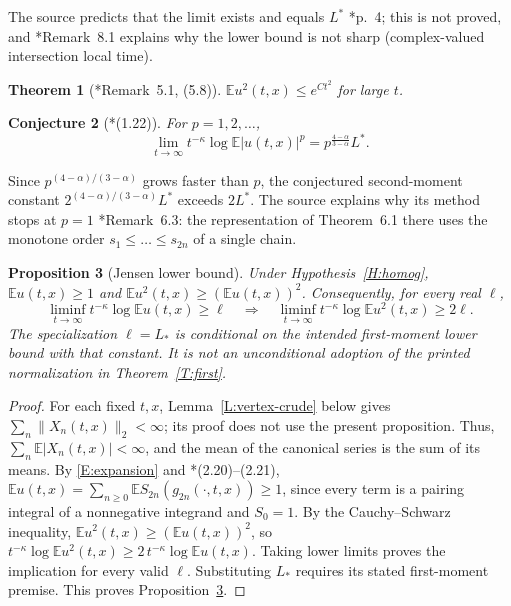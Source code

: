 \documentclass[12pt]{article}
\numberwithin{equation}{section}
\newtheorem{theorem}{Theorem}[section]
\newtheorem{proposition}[theorem]{Proposition}
\newtheorem{conjecture}[theorem]{Conjecture}
\theoremstyle{definition}
\newcommand{\E}{\mathbb{E}}
\begin{document}
The source predicts that the limit exists and equals $L^*$
\cite{chen:author2026:time-dependency}*{p.~4}; this is not proved, and
\cite{chen:author2026:time-dependency}*{Remark~8.1} explains why the lower
bound is not sharp (complex-valued intersection local time).

\begin{theorem}[\cite{chen:author2026:time-dependency}*{Remark~5.1, (5.8)}]\label{T:crude}
  $\E u^2(t,x)\le e^{Ct^2}$ for large $t$.
\end{theorem}

\begin{conjecture}[\cite{chen:author2026:time-dependency}*{(1.22)}]\label{Conj:allp}
  For $p=1,2,\dots$,
  \[
    \lim_{t\to\infty}t^{-\kappa}\log\E|u(t,x)|^p
    =p^{\frac{4-\alpha}{3-\alpha}}L^*.
  \]
\end{conjecture}

Since $p^{(4-\alpha)/(3-\alpha)}$ grows faster than $p$, the conjectured
second-moment constant $2^{(4-\alpha)/(3-\alpha)}L^*$ exceeds $2L^*$.
The source explains why its method stops at $p=1$
\cite{chen:author2026:time-dependency}*{Remark~6.3}: the representation of
Theorem~6.1 there uses the monotone order $s_1\le\dots\le s_{2n}$ of a single
chain.

\begin{proposition}[Jensen lower bound]\label{P:Jensen}
  Under Hypothesis~\ref{H:homog}, $\E u(t,x)\ge1$ and
  $\E u^2(t,x)\ge(\E u(t,x))^2$. Consequently, for every real $\ell$,
  \[
    \liminf_{t\to\infty}t^{-\kappa}\log\E u(t,x)\ge\ell
    \quad\Longrightarrow\quad
    \liminf_{t\to\infty}t^{-\kappa}\log\E u^2(t,x)\ge2\ell.
  \]
  The specialization $\ell=L_*$ is conditional on the intended
  first-moment lower bound with that constant. It is not an unconditional
  adoption of the printed normalization in Theorem~\ref{T:first}.
\end{proposition}

\begin{proof}
  For each fixed $t,x$, Lemma~\ref{L:vertex-crude} below gives
  $\sum_n\|X_n(t,x)\|_2<\infty$; its proof does not use the present
  proposition. Thus, $\sum_n\E|X_n(t,x)|<\infty$, and the mean of
  the canonical series is the sum of its means.
  By \eqref{E:expansion} and \cite{chen:author2026:time-dependency}*{(2.20)--(2.21)},
  $\E u(t,x)=\sum_{n\ge0}\E S_{2n}(g_{2n}(\cdot,t,x))\ge1$, since every term is
  a pairing integral of a nonnegative integrand and $S_0=1$. By the
  Cauchy--Schwarz inequality, $\E u^2(t,x)\ge(\E u(t,x))^2$, so
  $t^{-\kappa}\log\E u^2(t,x)\ge2\,t^{-\kappa}\log\E u(t,x)$.
  Taking lower limits proves the implication for every valid $\ell$.
  Substituting $L_*$ requires its stated first-moment premise.
  This proves Proposition~\ref{P:Jensen}.
\end{proof}
\end{document}
